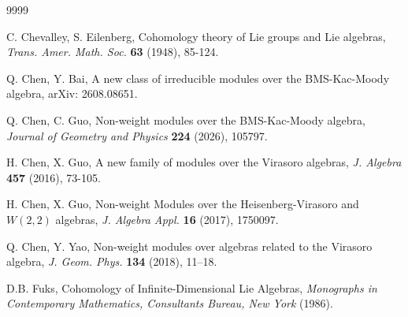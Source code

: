 \documentclass[12pt,reqno]{amsart}
\numberwithin{equation}{section}
\begin{document}
\small \begin{thebibliography}{9999} 



 


C. Chevalley, S. Eilenberg,
Cohomology theory of Lie groups and Lie algebras,
{\it Trans. Amer. Math. Soc.} {\bf 63} (1948), 85-124.

Q. Chen, Y. Bai, A new class of irreducible modules over the BMS-Kac-Moody algebra, arXiv: 2608.08651.


Q. Chen, C. Guo, Non-weight modules over the BMS-Kac-Moody algebra, {\it Journal of Geometry and Physics} {\bf 224} (2026), 105797.

 







 H.    Chen, X. Guo, A new family of modules over the Virasoro algebras,
{\it J. Algebra } {\bf 457}  (2016), 73-105.

   H.    Chen, X. Guo, Non-weight Modules over the Heisenberg-Virasoro and $W(2,2)$ algebras,
{\it J. Algebra Appl.} {\bf 16}  (2017),  1750097.


 


 Q. Chen, Y. Yao, Non-weight modules over algebras related to the Virasoro algebra, {\it J. Geom. Phys.} {\bf 134} (2018), 11–18.


D.B. Fuks,
Cohomology of Infinite-Dimensional Lie Algebras,
{\it Monographs in Contemporary Mathematics,
Consultants Bureau, New York} (1986).






\end{thebibliography}
\end{document}
